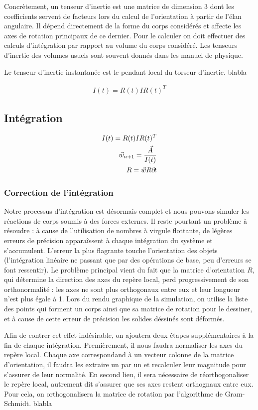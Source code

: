 Concrètement, un tenseur d'inertie est une matrice de dimension 3 dont
les coefficients servent de facteurs lors du calcul de l'orientation à
partir de l'élan angulaire. Il dépend directement de la forme du corps
considérés et affecte les axes de rotation principaux de ce
dernier. Pour le calculer on doit effectuer des calculs d'intégration
par rapport au volume du corps considéré. Les tenseurs d'inertie des
volumes usuels sont souvent donnés dans les manuel de physique.

Le tenseur d'inertie instantanée est le pendant local du torseur
d'inertie. blabla

\begin{align*}
  I(t) = R(t) I R(t)^T
\end{align*}

\subsection{Intégration}

\begin{align*}
  I(t) = R(t) I R(t)^T \\ \vec{w}_{n+1} = \frac{\vec{A}}{I(t)} \\ R =
  \vec{w} R \partial \! t
\end{align*}

\subsubsection{Correction de l'intégration}

Notre processus d'intégration est désormais complet et nous pouvons
simuler les réactions de corps soumis à des forces externes. Il reste
pourtant un problème à résoudre : à cause de l'utilisation de nombres
à virgule flottante, de légères erreurs de précision apparaîssent à
chaque intégration du système et s'accumulent. L'erreur la plus
flagrante touche l'orientation des objets (l'intégration linéaire ne
passant que par des opérations de base, peu d'erreurs se font
ressentir). Le problème principal vient du fait que la matrice
d'orientation $R$, qui détermine la direction des axes du repère
local, perd progressivement de son orthonormalité : les axes ne sont
plus orthogonaux entre eux et leur longueur n'est plus égale à 1. Lors
du rendu graphique de la simulation, on utilise la liste des points
qui forment un corps ainsi que sa matrice de rotation pour le
dessiner, et à cause de cette erreur de précision les solides déssinés
sont déformés.

Afin de contrer cet effet indésirable, on ajoutera deux étapes
supplémentaires à la fin de chaque intégration. Premièrement, il nous
faudra normaliser les axes du repère local. Chaque axe correspondand à
un vecteur colonne de la matrice d'orientation, il faudra les extraire
un par un et recalculer leur magnitude pour s'assurer de leur
normalité. En second lieu, il sera nécessaire de réorthogonaliser le
repère local, autrement dit s'assurer que ses axes restent orthognaux
entre eux. Pour cela, on orthogonalisera la matrice de rotation
par l'algorithme de Gram-Schmidt. blabla
